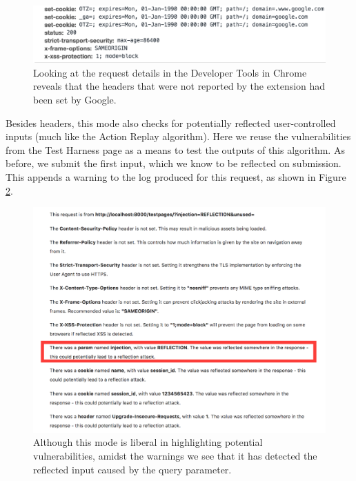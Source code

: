 \begin{figure}[h!]
	\centering
	\includegraphics[width=\textwidth]{images/google_headers_2.png}
	\caption{Looking at the request details in the Developer Tools in Chrome reveals that the headers that were not reported by the extension had been set by Google.}
	\label{fig:google_headers_2}
\end{figure}

Besides headers, this mode also checks for potentially reflected user-controlled inputs (much like the Action Replay algorithm). Here we reuse the vulnerabilities from the Test Harness page as a means to test the outputs of this algorithm. As before, we submit the first input, which we know to be reflected on submission. This appends a warning to the log produced for this request, as shown in Figure \ref{fig:passive_reflection}.

\begin{figure}[h!]
	\centering
	\includegraphics[width=\textwidth]{images/passive_reflection.png}
	\caption{Although this mode is liberal in highlighting potential vulnerabilities, amidst the warnings we see that it has detected the reflected input caused by the query parameter.}
	\label{fig:passive_reflection}
\end{figure}


